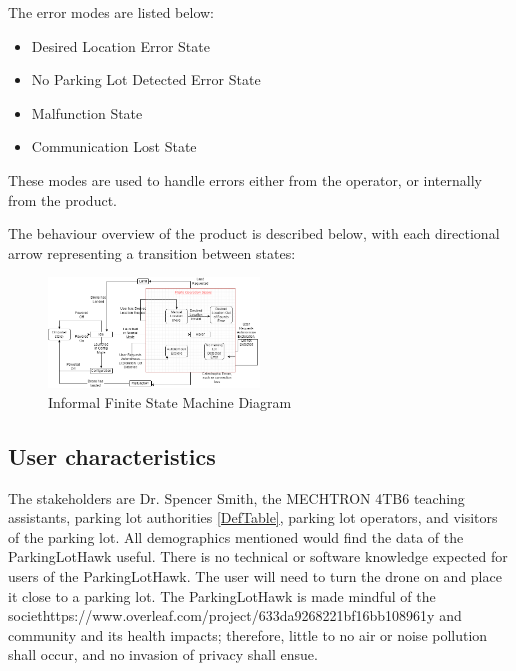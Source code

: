 \documentclass{article}
\begin{document}
The error modes are listed below:
\begin{itemize}
    \item Desired Location Error State
    \item No Parking Lot Detected Error State
    \item Malfunction State
    \item Communication Lost State
\end{itemize}
These modes are used to handle errors either from the operator, or internally from the product. 

The behaviour overview of the product is described below, with each directional arrow representing a transition between states:
\begin{figure}[h!]
  \begin{center} 
  \caption{Informal Finite State Machine Diagram } 
  \label{InfFSM}
 
        \includegraphics[width=0.5\textwidth]{InformalFSM.png}
  \end{center}
\end{figure}

\subsection{User characteristics}
The stakeholders are Dr. Spencer Smith, the MECHTRON 4TB6 teaching assistants, parking lot authorities \ref{DefTable}, parking lot operators, and visitors of the parking lot. All demographics mentioned would find the data of the ParkingLotHawk useful. There is no technical or software knowledge expected for users of the ParkingLotHawk. The user will need to turn the drone on and place it close to a parking lot.  The ParkingLotHawk is made mindful of the societhttps://www.overleaf.com/project/633da9268221bf16bb108961y and community and its health impacts; therefore, little to no air or noise pollution shall occur, and no invasion of privacy shall ensue.
\end{document}
